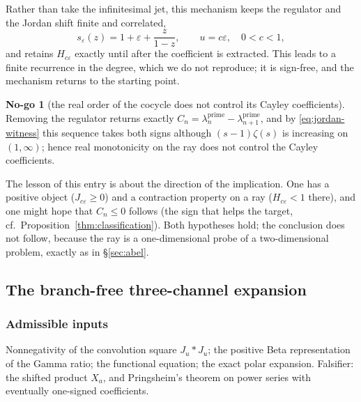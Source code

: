 \documentclass[11pt]{amsart}
\theoremstyle{definition}
\theoremstyle{remark}
\theoremstyle{definition}
\newtheorem{nogo}{No-go}[section]
\newcommand{\eps}{\varepsilon}
\begin{document}
Rather than take the infinitesimal jet, this mechanism keeps the regulator and the Jordan shift
finite and correlated,
\begin{equation}\label{eq:shift}
   s_\eps(z)=1+\eps+\frac{z}{1-z},\qquad u=c\eps,\quad0<c<1 ,
\end{equation}
and retains $H_{c\eps}$ exactly until after the coefficient is extracted. This leads to a finite
recurrence in the degree, which we do not reproduce; it is sign-free, and the mechanism returns to
the starting point.

\begin{nogo}[the real order of the cocycle does not control its Cayley
coefficients]\label{ng:shift}
Removing the regulator returns exactly
$C_n=\lambda_n^{\mathrm{prime}}-\lambda_{n+1}^{\mathrm{prime}}$, and by
\eqref{eq:jordan-witness} this sequence takes both signs although $(s-1)\zeta(s)$ is increasing
on $(1,\infty)$; hence real monotonicity on the ray does not control the Cayley coefficients.
\end{nogo}

\noindent The lesson of this entry is about the direction of the implication. One has a positive
object ($J_{c\eps}\ge0$) and a contraction property on a ray ($H_{c\eps}<1$ there), and one might
hope that $C_n\le0$ follows (the sign that helps the target, cf.\ Proposition~\ref{thm:classification}). Both hypotheses hold; the conclusion does not
follow, because the ray is a one-dimensional probe of a two-dimensional problem, exactly as in
\S\ref{sec:abel}.

\subsection{The branch-free three-channel expansion}\label{sec:three-channel}

\subsubsection*{Admissible inputs}
Nonnegativity of the convolution square $J_u*J_u$; the positive Beta representation of the Gamma
ratio; the functional equation; the exact polar expansion. Falsifier: the shifted product
$X_a$, and Pringsheim's theorem on power series with eventually one-signed coefficients.
\end{document}
